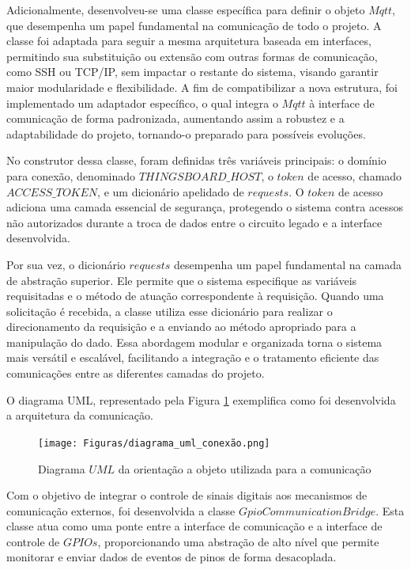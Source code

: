 \documentclass{ecatfg}
\begin{document}
Adicionalmente, desenvolveu-se uma classe específica para definir o objeto $Mqtt$, que desempenha um papel fundamental na comunicação de todo o projeto. A classe foi adaptada para seguir a mesma arquitetura baseada em interfaces, permitindo sua substituição ou extensão com outras formas de comunicação, como SSH ou TCP/IP, sem impactar o restante do sistema, visando garantir maior modularidade e flexibilidade. A fim de compatibilizar a nova estrutura, foi implementado um adaptador específico, o qual integra o $Mqtt$ à interface de comunicação de forma padronizada, aumentando assim a robustez e a adaptabilidade do projeto, tornando-o preparado para possíveis evoluções. \par

No construtor dessa classe, foram definidas três variáveis principais: o domínio para conexão, denominado $THINGSBOARD\_HOST$, o $token$ de acesso, chamado $ACCESS\_TOKEN$, e um dicionário apelidado de $requests$. O $token$ de acesso adiciona uma camada essencial de segurança, protegendo o sistema contra acessos não autorizados durante a troca de dados entre o circuito legado e a interface desenvolvida.\par

Por sua vez, o dicionário $requests$ desempenha um papel fundamental na camada de abstração superior. Ele permite que o sistema especifique as variáveis requisitadas e o método de atuação correspondente à requisição. Quando uma solicitação é recebida, a classe utiliza esse dicionário para realizar o direcionamento da requisição e a enviando ao método apropriado para a manipulação do dado. Essa abordagem modular e organizada torna o sistema mais versátil e escalável, facilitando a integração e o tratamento eficiente das comunicações entre as diferentes camadas do projeto. \par

O diagrama UML, representado pela Figura \ref{fig:diagrama_uml_conexão} exemplifica como foi desenvolvida a arquitetura da comunicação.
\begin{figure}[!htb]
    \centering
    \texttt{[image: Figuras/diagrama\_uml\_conexão.png]}
    \caption{Diagrama $UML$ da orientação a objeto utilizada para a comunicação}
    \label{fig:diagrama_uml_conexão}
\end{figure}

Com o objetivo de integrar o controle de sinais digitais aos mecanismos de comunicação externos, foi desenvolvida a classe $GpioCommunicationBridge$. Esta classe atua como uma ponte entre a interface de comunicação e a interface de controle de $GPIOs$, proporcionando uma abstração de alto nível que permite monitorar e enviar dados de eventos de pinos de forma desacoplada.\par
\end{document}
